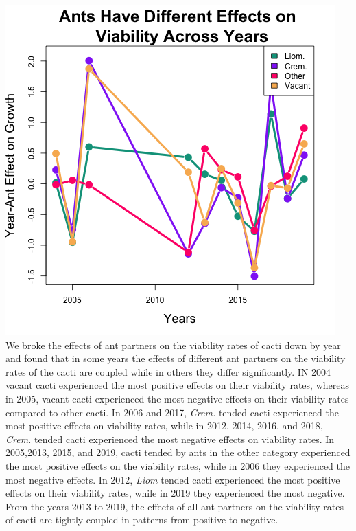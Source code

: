 \documentclass[12pt,a4paper]{article}
\begin{document}
{{\includegraphics{"Figures/viab_year_ant_timeseries.png"}
We broke the effects of ant partners on the viability rates of cacti down by year and found that in some years the effects of different ant partners on the viability rates of the cacti are coupled while in others they differ significantly. 
IN 2004 vacant cacti experienced the most positive effects on their viability rates, whereas in 2005, vacant cacti experienced the most negative effects on their viability rates compared to other cacti. 
In 2006 and 2017, \textit{Crem.} tended cacti experienced the most positive effects on viability rates, while in 2012, 2014, 2016, and 2018, \textit{Crem.} tended cacti experienced the most negative effects on viability rates. 
In 2005,2013, 2015, and 2019, cacti tended by ants in the other category experienced the most positive effects on the viability rates, while in 2006 they experienced the most negative effects. 
In 2012, \textit{Liom} tended cacti experienced the most positive effects on their viability rates, while in 2019 they experienced the most negative. 
From the years 2013 to 2019, the effects of all ant partners on the viability rates of cacti are tightly coupled in patterns from positive to negative. 

}}
\end{document}
